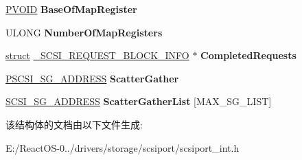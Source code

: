 \begin{DoxyCompactItemize}
\hyperlink{interfacevoid}{P\+V\+O\+ID} {\bfseries Base\+Of\+Map\+Register}
\item 
\mbox{\label{struct___s_c_s_i___r_e_q_u_e_s_t___b_l_o_c_k___i_n_f_o_a4f17ce1acb342c69154f09f25c2f88a6}} 
U\+L\+O\+NG {\bfseries Number\+Of\+Map\+Registers}
\item 
\mbox{\label{struct___s_c_s_i___r_e_q_u_e_s_t___b_l_o_c_k___i_n_f_o_a7ac1fc081ed944cca4afd2b158fa7e45}} 
\hyperlink{interfacestruct}{struct} \hyperlink{struct___s_c_s_i___r_e_q_u_e_s_t___b_l_o_c_k___i_n_f_o}{\+\_\+\+S\+C\+S\+I\+\_\+\+R\+E\+Q\+U\+E\+S\+T\+\_\+\+B\+L\+O\+C\+K\+\_\+\+I\+N\+FO} $\ast$ {\bfseries Completed\+Requests}
\item 
\mbox{\label{struct___s_c_s_i___r_e_q_u_e_s_t___b_l_o_c_k___i_n_f_o_ac0a6d0e2359bc4690b5e69336a2a3eab}} 
\hyperlink{struct___s_c_s_i___s_g___a_d_d_r_e_s_s}{P\+S\+C\+S\+I\+\_\+\+S\+G\+\_\+\+A\+D\+D\+R\+E\+SS} {\bfseries Scatter\+Gather}
\item 
\mbox{\label{struct___s_c_s_i___r_e_q_u_e_s_t___b_l_o_c_k___i_n_f_o_a18d7d292ff2d6b0ac3cec56d728910a1}} 
\hyperlink{struct___s_c_s_i___s_g___a_d_d_r_e_s_s}{S\+C\+S\+I\+\_\+\+S\+G\+\_\+\+A\+D\+D\+R\+E\+SS} {\bfseries Scatter\+Gather\+List} \mbox{[}M\+A\+X\+\_\+\+S\+G\+\_\+\+L\+I\+ST\mbox{]}
\end{DoxyCompactItemize}


该结构体的文档由以下文件生成\+:\begin{DoxyCompactItemize}
\item 
E\+:/\+React\+O\+S-\/0../drivers/storage/scsiport/scsiport\+\_\+int.\+h\end{DoxyCompactItemize}
